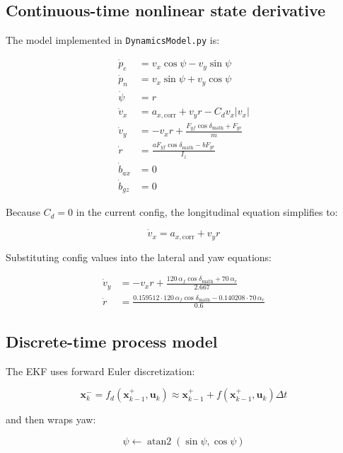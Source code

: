 \documentclass[11pt]{article}
\newcommand{\vect}[1]{\boldsymbol{#1}}
\begin{document}
\subsection{Continuous-time nonlinear state derivative}

The model implemented in \texttt{DynamicsModel.py} is:

\begin{align}
\dot{p}_e &= v_x\cos\psi - v_y\sin\psi \\
\dot{p}_n &= v_x\sin\psi + v_y\cos\psi \\
\dot{\psi} &= r \\
\dot{v}_x &= a_{x,\text{corr}} + v_y r - C_d v_x|v_x| \\
\dot{v}_y &= -v_x r + \frac{F_{yf}\cos\delta_{\text{math}} + F_{yr}}{m} \\
\dot{r} &= \frac{aF_{yf}\cos\delta_{\text{math}} - bF_{yr}}{I_z} \\
\dot{b}_{ax} &= 0 \\
\dot{b}_{gz} &= 0
\end{align}

Because $C_d = 0$ in the current config, the longitudinal equation simplifies to:

\begin{equation}
\dot{v}_x = a_{x,\text{corr}} + v_y r
\end{equation}

Substituting config values into the lateral and yaw equations:

\begin{align}
\dot{v}_y &= -v_x r + \frac{120\,\alpha_f\cos\delta_{\text{math}} + 70\,\alpha_r}{2.667} \\
\dot{r} &= \frac{0.159512\cdot 120\,\alpha_f\cos\delta_{\text{math}} - 0.140208\cdot 70\,\alpha_r}{0.6}
\end{align}

\subsection{Discrete-time process model}

The EKF uses forward Euler discretization:

\begin{equation}
\vect{x}_k^- = f_d(\vect{x}_{k-1}^+, \vect{u}_k)
\approx \vect{x}_{k-1}^+ + f(\vect{x}_{k-1}^+, \vect{u}_k)\Delta t
\end{equation}

and then wraps yaw:

\begin{equation}
\psi \leftarrow \operatorname{atan2}(\sin\psi,\cos\psi)
\end{equation}
\end{document}
